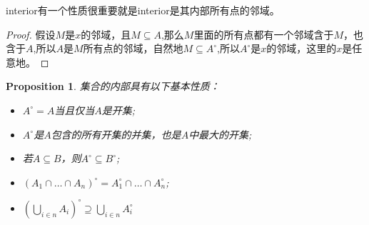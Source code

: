 \documentclass{article}
\newtheorem{proposition}[theorem]{Proposition}
\begin{document}
interior有一个性质很重要就是interior是其内部所有点的邻域。

\begin{proof}
假设$M$是$x$的邻域，且$M \subseteq A$,那么$M$里面的所有点都有一个邻域含于$M$，也含于$A$,所以$A$是$M$所有点的邻域，自然地$M \subseteq A^{\circ}$,所以$A^{\circ}$是$x$的邻域，这里的$x$是任意地。
\end{proof}


\begin{proposition}
集合的内部具有以下基本性质：
\begin{itemize}
	\item $A^{\circ}=A$当且仅当$A$是开集;
	\item $A^{\circ}$是$A$包含的所有开集的并集，也是$A$中最大的开集;
	\item 若$A \subseteq B$，则$A^{\circ} \subseteq B^{\circ}$;
	\item $(A_1 \cap \ldots \cap A_n)^{\circ}=A_1^{\circ} \cap \ldots \cap A_n^{\circ}$;
	\item ${\left(\bigcup\limits_{i \in n} A_i\right)}^{\circ} \supseteq \bigcup\limits_{i \in n} A_i^{\circ}$
\end{itemize}
\end{proposition}
\end{document}
